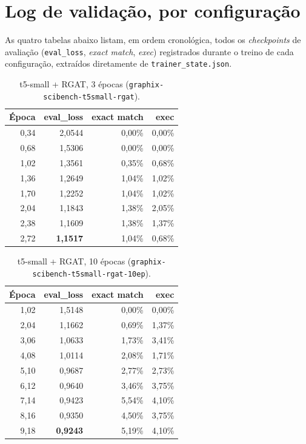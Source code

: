 \documentclass{article}
\begin{document}
\section{Log de validação, por configuração}
\label{sec:logs}

As quatro tabelas abaixo listam, em ordem cronológica, todos os
\emph{checkpoints} de avaliação (\texttt{eval\_loss}, \emph{exact
match}, \emph{exec}) registrados durante o treino de cada configuração,
extraídos diretamente de \texttt{trainer\_state.json}.

\begin{table}[h]
\centering
\caption{t5-small + RGAT, 3 épocas (\texttt{graphix-scibench-t5small-rgat}).}
\begin{tabular}{rrrr}
\toprule
\textbf{Época} & \textbf{eval\_loss} & \textbf{exact match} & \textbf{exec} \\
\midrule
0,34 & 2,0544 & 0,00\% & 0,00\% \\
0,68 & 1,5306 & 0,00\% & 0,00\% \\
1,02 & 1,3561 & 0,35\% & 0,68\% \\
1,36 & 1,2649 & 1,04\% & 1,02\% \\
1,70 & 1,2252 & 1,04\% & 1,02\% \\
2,04 & 1,1843 & 1,38\% & 2,05\% \\
2,38 & 1,1609 & 1,38\% & 1,37\% \\
2,72 & \textbf{1,1517} & 1,04\% & 0,68\% \\
\bottomrule
\end{tabular}
\end{table}

\begin{table}[h]
\centering
\caption{t5-small + RGAT, 10 épocas (\texttt{graphix-scibench-t5small-rgat-10ep}).}
\begin{tabular}{rrrr}
\toprule
\textbf{Época} & \textbf{eval\_loss} & \textbf{exact match} & \textbf{exec} \\
\midrule
1,02 & 1,5148 & 0,00\% & 0,00\% \\
2,04 & 1,1662 & 0,69\% & 1,37\% \\
3,06 & 1,0633 & 1,73\% & 3,41\% \\
4,08 & 1,0114 & 2,08\% & 1,71\% \\
5,10 & 0,9687 & 2,77\% & 2,73\% \\
6,12 & 0,9640 & 3,46\% & 3,75\% \\
7,14 & 0,9423 & 5,54\% & 4,10\% \\
8,16 & 0,9350 & 4,50\% & 3,75\% \\
9,18 & \textbf{0,9243} & 5,19\% & 4,10\% \\
\bottomrule
\end{tabular}
\end{table}
\end{document}
